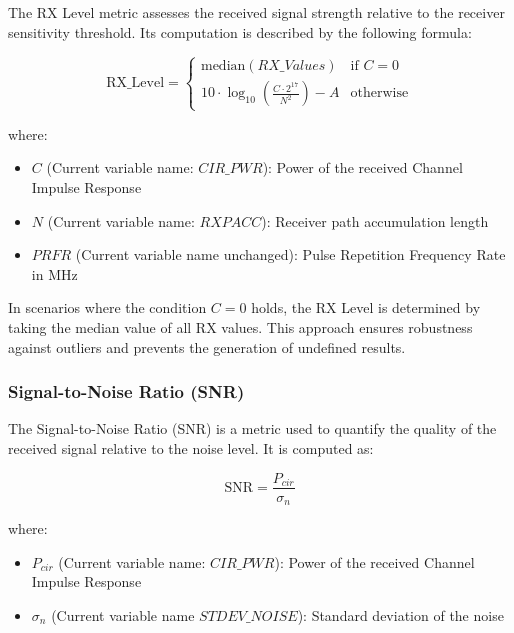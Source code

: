 The RX Level metric assesses the received signal strength relative to the receiver sensitivity threshold. Its computation is described by the following formula:

\begin{equation}
  \text{RX\_Level} =
  \begin{cases}
    \text{median}(RX\_Values) & \text{if } C = 0 \\
    10 \cdot \log_{10} \left( \frac{C \cdot 2^{17}}{N^2} \right) - A & \text{otherwise}
  \end{cases}
\end{equation}

where:

\begin{itemize}
  \item $C$ (Current variable name: $CIR\_PWR$): Power of the received Channel Impulse Response
  \item $N$ (Current variable name: $RXPACC$): Receiver path accumulation length
  \item $PRFR$ (Current variable name unchanged): Pulse Repetition Frequency Rate in MHz
\end{itemize}

In scenarios where the condition $C = 0$ holds, the RX Level is determined by taking the median value of all RX values. This approach ensures robustness against outliers and prevents the generation of undefined results.


\subsubsection{Signal-to-Noise Ratio (SNR)}\label{snr}

The Signal-to-Noise Ratio (SNR) is a metric used to quantify the quality of the received signal relative to the noise level. It is computed as:

\begin{equation}
  \text{SNR} = \frac{P_{cir}}{\sigma_n}
\end{equation}

where:

\begin{itemize}
  \item $P_{cir}$ (Current variable name: $CIR\_PWR$): Power of the received Channel Impulse Response
  \item $\sigma_n$ (Current variable name $STDEV\_NOISE$): Standard deviation of the noise
\end{itemize}

